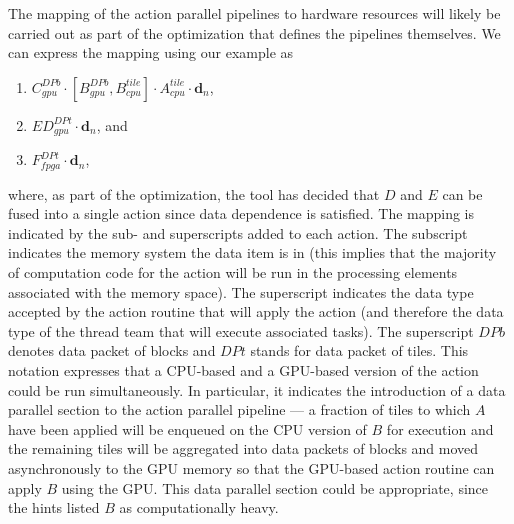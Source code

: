 \documentclass{article}
\begin{document}
The mapping of the action parallel pipelines to hardware resources will likely
be carried out as part of the optimization
that defines the pipelines themselves.  We can express the mapping using our
example as
\begin{enumerate}
\item{$C_{gpu}^{DPb} \cdot \left[B_{gpu}^{DPb},B_{cpu}^{tile}\right] \cdot
A_{cpu}^{tile}\cdot \mathbf{d}_n$},
\item{$ED_{gpu}^{DPt}\cdot\mathbf{d}_n$}, and
\item{$F_{fpga}^{DPt} \cdot\mathbf{d}_n$},
\end{enumerate}
where, as part of the optimization, the tool has
decided that $D$ and $E$ can be fused into a single action since
data dependence is satisfied.  The mapping is indicated by the sub- and
superscripts added to each action.  The subscript indicates the memory
system the data item is in (this implies that the majority of
computation code for the action will be run in the processing elements
associated with the memory space). The superscript indicates the data type accepted by
the action routine that will apply the action (and therefore the data type of
the thread team that will execute associated tasks).  The superscript $DPb$ denotes
data packet of blocks and $DPt$ stands for data packet of tiles.
 This notation expresses that a CPU-based and a GPU-based version
of the action could be run simultaneously.  In particular, it indicates the
introduction of a data parallel section to the action parallel pipeline --- a
fraction of tiles to which $A$ have been applied will be enqueued on the CPU
version of $B$ for execution and the remaining tiles will be aggregated into
data packets of blocks and moved asynchronously to the GPU memory so that the
GPU-based action routine can apply $B$ using the GPU.  This data parallel
section could be appropriate, since the hints listed $B$ as computationally
heavy.\\
\end{document}
